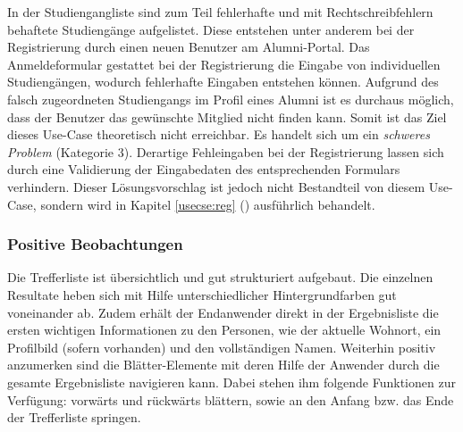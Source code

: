 {
	In der Studiengangliste sind zum Teil fehlerhafte und mit Rechtschreibfehlern behaftete Studiengänge aufgelistet. Diese entstehen unter anderem bei der Registrierung durch einen neuen Benutzer am Alumni-Portal. Das Anmeldeformular gestattet bei der Registrierung die Eingabe von individuellen Studiengängen, wodurch fehlerhafte Eingaben entstehen können.
}
{
	Aufgrund des falsch zugeordneten Studiengangs im Profil eines Alumni ist es durchaus möglich, dass der Benutzer das gewünschte Mitglied nicht finden kann. Somit ist das Ziel dieses Use-Case theoretisch nicht erreichbar. Es handelt sich um ein \emph{schweres Problem} (Kategorie 3).
}
{
	Derartige Fehleingaben bei der Registrierung lassen sich durch eine Validierung der Eingabedaten des entsprechenden Formulars verhindern. Dieser Lösungsvorschlag ist jedoch nicht Bestandteil von diesem Use-Case, sondern wird in Kapitel \ref{usecse:reg} () ausführlich behandelt.
}
\label{prob:suche:ungueltigestudiengaenge}


\subsubsection*{Positive Beobachtungen}
Die Trefferliste ist übersichtlich und gut strukturiert aufgebaut. Die einzelnen Resultate heben sich mit Hilfe unterschiedlicher Hintergrundfarben gut voneinander ab. Zudem erhält der Endanwender direkt in der Ergebnisliste die ersten wichtigen Informationen zu den Personen, wie der aktuelle Wohnort, ein Profilbild (sofern vorhanden) und den vollständigen Namen. Weiterhin positiv anzumerken sind die Blätter-Elemente mit deren Hilfe der Anwender durch die gesamte Ergebnisliste navigieren kann. Dabei stehen ihm folgende Funktionen zur Verfügung: vorwärts und rückwärts blättern, sowie an den Anfang bzw. das Ende der Trefferliste springen. 


